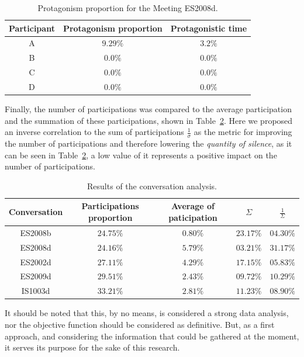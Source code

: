 \begin{table}[H]
    \centering
    \begin{tabular}{ccc}
    \hline
    Participant & Protagonism proportion & Protagonistic time\\ \hline 
    A           & $9.29\%$               & $3.2\%$            \\
    B           & $0.0\%$                & $0.0\%$            \\
    C           & $0.0\%$                & $0.0\%$            \\
    D           & $0.0\%$                & $0.0\%$            \\
    \hline
    \end{tabular}
    \caption{Protagonism proportion for the Meeting ES2008d.}
    \label{table:res_ES2008d}
\end{table}

Finally, the number of participations was compared to the average participation and the summation of these participations, shown in Table~\ref{table:results_ami}. Here we proposed an inverse correlation to the sum of participations $\frac{1}{\sigma}$ as the metric for improving the number of participations and therefore lowering the \textit{quantity of silence}, as it can be seen in Table~\ref{table:results_ami}, a low value of it represents a positive impact on the number of participations.\\

\begin{table}[H]
    \centering
    \begin{tabular}{ccccc}
    \hline
    Conversation & Participations proportion & Average  of paticipation & $\Sigma$ & $\frac{1}{\Sigma}$ \\ \hline
    ES2008b & $24.75\%$ & $0.80\%$ & $23.17\%$  & $04.30\%$ \\
    ES2008d & $24.16\%$ & $5.79\%$ & $03.21\%$  & $31.17\%$ \\
    ES2002d & $27.11\%$ & $4.29\%$ & $17.15\%$  & $05.83\%$ \\
    ES2009d & $29.51\%$ & $2.43\%$ & $09.72\%$  & $10.29\%$ \\
    IS1003d & $33.21\%$ & $2.81\%$ & $11.23\%$  & $08.90\%$ \\
    \hline
    \end{tabular}
    \caption{Results of the conversation analysis.}
    \label{table:results_ami}
\end{table}

It should be noted that this, by no means, is considered a strong data analysis, nor the objective function should be considered as definitive. But, as a first approach, and considering the information that could be gathered at the moment, it serves its purpose for the sake of this research.\\

